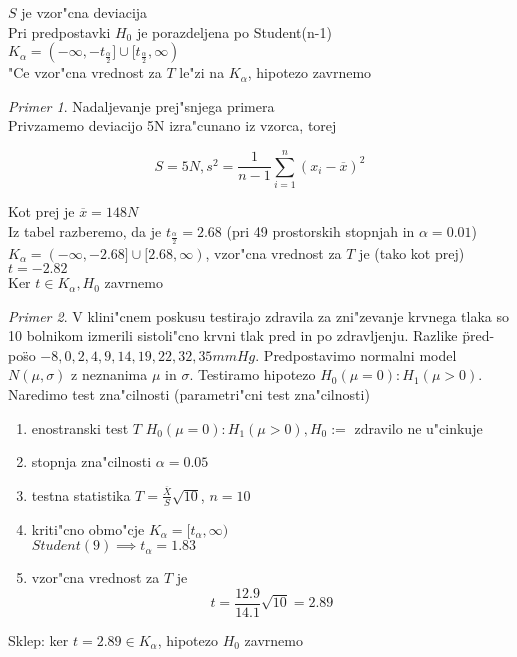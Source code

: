 \documentclass[a4paper,12pt]{article}
\theoremstyle{definition}
\theoremstyle{remark}
\newtheorem*{ex}{Primer}
\begin{document}
$S$ je vzor"cna deviacija \\
Pri predpostavki $H_0$ je porazdeljena po Student(n-1) \\
$K_{\alpha} = (-\infty, -t_{\frac{\alpha}{2}}] \cup [t_{\frac{\alpha}{2}}, \infty)$ \\
"Ce vzor"cna vrednost za $T$ le"zi na $K_{\alpha}$, hipotezo zavrnemo

\begin{ex}
    Nadaljevanje prej"snjega primera \\
    Privzamemo deviacijo 5N izra"cunano iz vzorca, torej

    \begin{equation*}
        S = 5N, s^2 = \frac{1}{n-1} \sum_{i=1}^{n} (x_i - \overline{x})^2
    \end{equation*}

    Kot prej je $\overline{x} = 148N$ \\
    Iz tabel razberemo, da je $t_{\frac{\alpha}{2}} = 2.68$ (pri 49 prostorskih stopnjah in $\alpha = 0.01$) \\
    $K_{\alpha} = (-\infty, -2.68] \cup [2.68, \infty)$, vzor"cna vrednost za $T$ je (tako kot prej) $t = -2.82$ \\
    Ker $t \in K_{\alpha}, H_0$ zavrnemo
\end{ex}

\begin{ex}
    V klini"cnem poskusu testirajo zdravila za zni"zevanje krvnega tlaka so 10 bolnikom izmerili sistoli"cno krvni
    tlak pred in po zdravljenju. Razlike \"pred-po\" so $-8,0,2,4,9,14,19,22,32,35 mmHg$. Predpostavimo normalni model
    $N(\mu, \sigma)$ z neznanima $\mu$ in $\sigma$. Testiramo hipotezo $H_0(\mu = 0) : H_1(\mu > 0)$. Naredimo
    test zna"cilnosti (parametri"cni test zna"cilnosti)
    
    \begin{enumerate}
        \item enostranski test $T$ $H_0(\mu = 0) : H_1(\mu > 0), H_0 :=$ zdravilo ne u"cinkuje
        \item stopnja zna"cilnosti $\alpha = 0.05$
        \item testna statistika $T = \frac{\overline{X}}{S} \sqrt{10}$, $n=10$
        \item kriti"cno obmo"cje $K_{\alpha} = [t_{\alpha}, \infty)$ \\
            $Student(9) \implies t_{\alpha} = 1.83$
        \item vzor"cna vrednost za $T$ je
            \begin{equation*}
                t = \frac{12.9}{14.1} \sqrt{10} = 2.89
            \end{equation*}
    \end{enumerate}

    Sklep: ker $t = 2.89 \in K_{\alpha}$, hipotezo $H_0$ zavrnemo
\end{ex}
\end{document}
